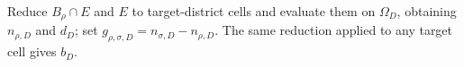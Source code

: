 Reduce \(B_\rho\cap E\) and \(E\) to target-district cells and evaluate them on \(\Omega_D\), obtaining \(n_{\rho,D}\) and \(d_D\); set \(g_{\rho,\sigma,D}=n_{\sigma,D}-n_{\rho,D}\). The same reduction applied to any target cell gives \(b_D\).